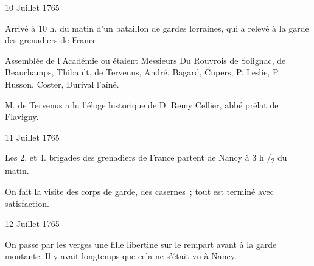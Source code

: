                      \begin{diary}{10 Juillet 1765}{}
                        
                         Arrivé à 10 h. du matin d'un bataillon
                           de gardes lorraines, qui a relevé à la garde
                           des grenadiers de France
                        \bigskip
        
        
                         Assemblée de l'Académie ou étaient Messieurs
                           Du Rouvrois
                           de Solignac, de Beauchamps, Thibault, de
                           Tervenus,
                           André, Bagard, Cupers,
                              P. Leslie, P. Husson, Coster,
                           Durival l'aîné. \bigskip
        
        
                        
                           M. de Tervenus a lu l'éloge historique de
                              D. Remy
                                 Cellier, \sout{abbé} prélat de Flavigny. \bigskip
        
        
                     \end{diary}
                     

                     \begin{diary}{11 Juillet 1765}{}
                        
                         Les 2. et 4. brigades des grenadiers de
                           France partent de Nancy à 3 h
                              /\textsubscript{2} du matin. \bigskip
        
        
                         On fait la visite des corps de garde,
                           des
                           casernes ; tout est terminé avec satisfaction. \bigskip
        
        
                     \end{diary}

                     \begin{diary}{12 Juillet 1765}{}
                        
                         On passe par les verges une fille libertine
                           sur le rempart avant
                           à la garde montante. Il y avait longtemps
                           que cela ne s'était vu à Nancy. \bigskip
        
        
                     \end{diary}

